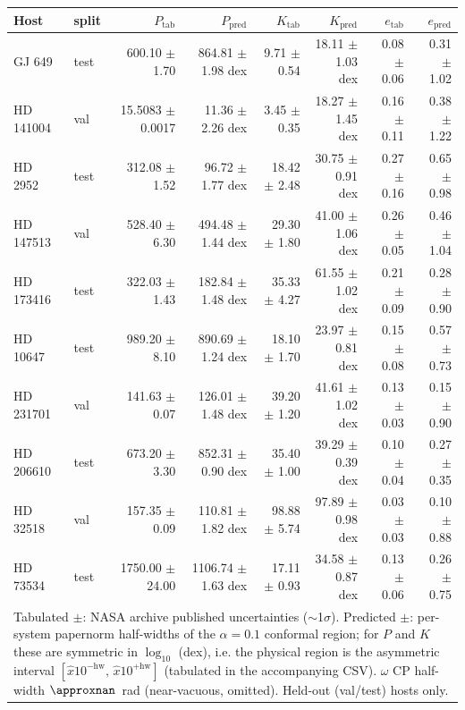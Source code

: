 \begin{tabular}{llrrrrrr}
\hline
Host & split & $P_{\mathrm{tab}}$ & $P_{\mathrm{pred}}$ & $K_{\mathrm{tab}}$ & $K_{\mathrm{pred}}$ & $e_{\mathrm{tab}}$ & $e_{\mathrm{pred}}$ \\
\hline
GJ 649 & test & 600.10 $\pm$ 1.70 & 864.81 $\pm$ 1.98 dex & 9.71 $\pm$ 0.54 & 18.11 $\pm$ 1.03 dex & 0.08 $\pm$ 0.06 & 0.31 $\pm$ 1.02 \\
HD 141004 & val & 15.5083 $\pm$ 0.0017 & 11.36 $\pm$ 2.26 dex & 3.45 $\pm$ 0.35 & 18.27 $\pm$ 1.45 dex & 0.16 $\pm$ 0.11 & 0.38 $\pm$ 1.22 \\
HD 2952 & test & 312.08 $\pm$ 1.52 & 96.72 $\pm$ 1.77 dex & 18.42 $\pm$ 2.48 & 30.75 $\pm$ 0.91 dex & 0.27 $\pm$ 0.16 & 0.65 $\pm$ 0.98 \\
HD 147513 & val & 528.40 $\pm$ 6.30 & 494.48 $\pm$ 1.44 dex & 29.30 $\pm$ 1.80 & 41.00 $\pm$ 1.06 dex & 0.26 $\pm$ 0.05 & 0.46 $\pm$ 1.04 \\
HD 173416 & test & 322.03 $\pm$ 1.43 & 182.84 $\pm$ 1.48 dex & 35.33 $\pm$ 4.27 & 61.55 $\pm$ 1.02 dex & 0.21 $\pm$ 0.09 & 0.28 $\pm$ 0.90 \\
HD 10647 & test & 989.20 $\pm$ 8.10 & 890.69 $\pm$ 1.24 dex & 18.10 $\pm$ 1.70 & 23.97 $\pm$ 0.81 dex & 0.15 $\pm$ 0.08 & 0.57 $\pm$ 0.73 \\
HD 231701 & val & 141.63 $\pm$ 0.07 & 126.01 $\pm$ 1.48 dex & 39.20 $\pm$ 1.20 & 41.61 $\pm$ 1.02 dex & 0.13 $\pm$ 0.03 & 0.15 $\pm$ 0.90 \\
HD 206610 & test & 673.20 $\pm$ 3.30 & 852.31 $\pm$ 0.90 dex & 35.40 $\pm$ 1.00 & 39.29 $\pm$ 0.39 dex & 0.10 $\pm$ 0.04 & 0.27 $\pm$ 0.35 \\
HD 32518 & val & 157.35 $\pm$ 0.09 & 110.81 $\pm$ 1.82 dex & 98.88 $\pm$ 5.74 & 97.89 $\pm$ 0.98 dex & 0.03 $\pm$ 0.03 & 0.10 $\pm$ 0.88 \\
HD 73534 & test & 1750.00 $\pm$ 24.00 & 1106.74 $\pm$ 1.63 dex & 17.11 $\pm$ 0.93 & 34.58 $\pm$ 0.87 dex & 0.13 $\pm$ 0.06 & 0.26 $\pm$ 0.75 \\
\hline
\multicolumn{8}{l}{\footnotesize Tabulated $\pm$: NASA archive published uncertainties ($\sim$1$\sigma$). Predicted $\pm$: per-system papernorm half-widths of the $\alpha{=}0.1$ conformal region; for $P$ and $K$ these are symmetric in $\log_{10}$ (dex), i.e. the physical region is the asymmetric interval $[\hat{x}10^{-\mathrm{hw}},\,\hat{x}10^{+\mathrm{hw}}]$ (tabulated in the accompanying CSV). $\omega$ CP half-width $\approxnan$~rad (near-vacuous, omitted). Held-out (val/test) hosts only.} \\
\end{tabular}
